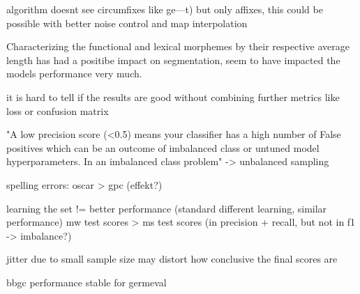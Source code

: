 
algorithm doesnt see circumfixes like ge---t) but only affixes, this could be possible with better noise control and map interpolation

Characterizing the functional and lexical morphemes by their respective average length has had a positibe impact on segmentation, seem to have impacted the models performance very much.

it is hard to tell if the results are good without combining further metrics like loss or confusion matrix

"A low precision score (<0.5) means your classifier has a high number of False positives which can be an outcome of imbalanced class or untuned model hyperparameters. In an imbalanced class problem"
-> unbalanced sampling



spelling errors: oscar > gpc (effekt?)

learning the set != better performance (standard different learning, similar performance)
mw test scores > ms test scores (in precision + recall, but not in f1 -> imbalance?)

jitter due to small sample size may distort how conclusive the final scores are

bbgc performance stable for germeval \cite{germeval}